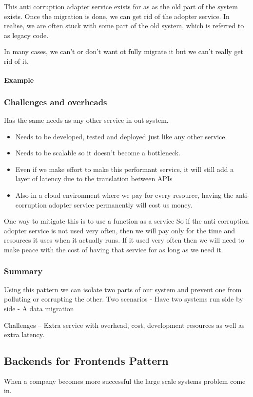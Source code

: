 This anti corruption adapter service exists for as as the old part of the system exists.
Once the migration is done, we can get rid of the adopter service.
In realise, we are often stuck with some part of the old system, which is referred to as legacy code.

In many cases, we can't or don't want ot fully migrate it but we can't really get rid of it.

\paragraph{Example}

\subsubsection{Challenges and overheads}
Has the same needs as any other service in out system.
\begin{itemize}
    \item Needs to be developed, tested and deployed just like any other service.
    \item Needs to be scalable so it doesn't become a bottleneck.
    \item Even if we make effort to make this performant service, it will still add a layer of latency due to the translation between APIs
    \item Also in a cloud environment where we pay for every resource, having the anti-corruption adopter service permanently will cost us money.
\end{itemize}

One way to mitigate this is to use a function as a service
So if the anti corruption adopter service is not used very often, then we will pay only for the time and resources it uses when it actually runs.
If it used very often then we will need to make peace with the cost of having that service for as long as we need it.

\subsubsection{Summary}
Using this pattern we can isolate two parts of our system and prevent one from polluting or corrupting the other.
Two scenarios
- Have two systems run side by side
- A data migration

Challenges
-- Extra service with overhead, cost, development resources as well as extra latency.

\subsection{Backends for Frontends Pattern}
When a company becomes more successful the large scale systems problem come in.

